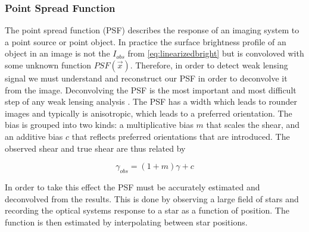 \subsubsection{Point Spread Function}
The point spread function (PSF) describes the response of an imaging system to a point source or point object. In practice the surface brightness profile of an object in an image is not the $I_{obs}$ from \autoref{eq:linearizedbright} but is convoloved with some unknown function $PSF(\vec{x})$. Therefore, in order to detect weak lensing signal we must understand and reconstruct our PSF in order to deconvolve it from the image. Deconvolving the PSF is the most important and most difficult step of any weak lensing analysis \cite{Hoekstra:2013gua,rachel_2018}. The PSF has a width which leads to rounder images and typically is anisotropic, which leads to a preferred orientation. The bias is grouped into two kinds: a multiplicative bias $m$ that scales the shear, and an additive bias $c$ that reflects preferred orientations that are introduced. The observed shear and true shear are thus related by

\begin{equation}
    \gamma_{obs} = (1+m) \gamma + c
     \label{eq:shearobs}
\end{equation}

In order to take this effect the PSF must be accurately estimated and deconvolved from the results. This is done by observing a large field of stars and recording the optical systems response to a star as a function of position. The function is then estimated by interpolating between star positions.


